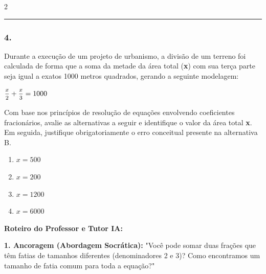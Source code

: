 \begin{multicols*}{2}
\par\vspace{\espacoQuestao}


\noindent\textcolor{CorLinha}{\rule{\linewidth}{0.5pt}} 
\par\vspace{\espacoPreQuestao}
\subsubsection*{4.} 
\begin{enunciadoLiteral}
Durante a execução de um projeto de urbanismo, a divisão de um terreno foi calculada de forma que a soma da metade da área total (\textbf{x}) com sua terça parte seja igual a exatos 1000 metros quadrados, gerando a seguinte modelagem:

$ \mfrac{x}{2} + \mfrac{x}{3} = 1000 $

Com base nos princípios de resolução de equações envolvendo coeficientes fracionários, avalie as alternativas a seguir e identifique o valor da área total \textbf{x}. Em seguida, justifique obrigatoriamente o erro conceitual presente na alternativa B.

\begin{enumerate}[label=\alph*), itemsep=\espacoAlt]
\item $ x = 500 $
\item $ x = 200 $
\item $ x = 1200 $
\item $ x = 6000 $
\end{enumerate}
\end{enunciadoLiteral}

\ifgabarito
    \begin{tcolorbox}[colback=CorTitUm!5, colframe=CorTitUm, boxrule=1pt, arc=4pt, left=6pt, right=6pt, top=6pt, bottom=6pt]
    \small\textbf{\textcolor{CorTitUm}{Roteiro do Professor e Tutor IA:}}\par\vspace{0.1cm}
    \color{CinzaEscuro}
    \textbf{1. Ancoragem (Abordagem Socrática):} "Você pode somar duas frações que têm fatias de tamanhos diferentes (denominadores 2 e 3)? Como encontramos um tamanho de fatia comum para toda a equação?"\par\vspace{0.1cm}
    

\end{tcolorbox}
\end{multicols*}
